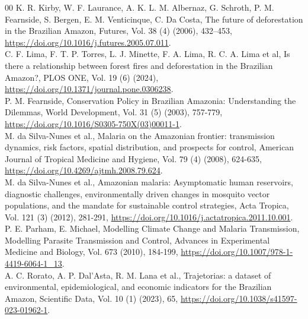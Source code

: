 \documentclass[a4paper,fleqn]{cas-dc}
\begin{document}
\begin{thebibliography}{00}
 K. R. Kirby, W. F. Laurance, A. K. L. M. Albernaz, G. Schroth, P. M. Fearnside, S. Bergen, E. M. Venticinque, C. Da Costa, The future of deforestation in the Brazilian Amazon, Futures, Vol. 38 (4) (2006), 432–453, \href{https://doi.org/10.1016/j.futures.2005.07.011}{https://doi.org/10.1016/j.futures.2005.07.011}.
\\
 C. F. Lima, F. T. P. Torres, L. J. Minette, F. A. Lima, R. C. A. Lima et al, Is there a relationship between forest fires and deforestation in the Brazilian Amazon?, PLOS ONE, Vol. 19 (6) (2024), \href{https://doi.org/10.1371/journal.pone.0306238}{https://doi.org/10.1371/journal.pone.0306238}.
\\
 P. M. Fearnside, Conservation Policy in Brazilian Amazonia: Understanding the Dilemmas, World Development, Vol. 31 (5) (2003), 757-779, \href{https://doi.org/10.1016/S0305-750X(03)00011-1}{https://doi.org/10.1016/S0305-750X(03)00011-1}.
\\
 M. da Silva-Nunes et al., Malaria on the Amazonian frontier: transmission dynamics, risk factors, spatial distribution, and prospects for control, American Journal of Tropical Medicine and Hygiene, Vol. 79 (4) (2008), 624-635, \href{https://doi.org/10.4269/ajtmh.2008.79.624}{https://doi.org/10.4269/ajtmh.2008.79.624}. 
\\
 M. da Silva-Nunes et al., Amazonian malaria: Asymptomatic human reservoirs, diagnostic challenges, environmentally driven changes in mosquito vector populations, and the mandate for sustainable control strategies, Acta Tropica, Vol. 121 (3) (2012), 281-291, \href{https://doi.org/10.1016/j.actatropica.2011.10.001}{https://doi.org/10.1016/j.actatropica.2011.10.001}.
\\
 P. E. Parham, E. Michael, Modelling Climate Change and Malaria Transmission, Modelling Parasite Transmission and Control, Advances in Experimental Medicine and Biology, Vol. 673 (2010), 184-199, \href{https://doi.org/10.1007/978-1-4419-6064-1_13}{https://doi.org/10.1007/978-1-4419-6064-1\_13}.
\\
 A. C. Rorato, A. P. Dal’Asta, R. M. Lana et al., Trajetorias: a dataset of environmental, epidemiological, and economic indicators for the Brazilian Amazon, Scientific Data, Vol. 10 (1) (2023), 65, \href{https://doi.org/10.1038/s41597-023-01962-1}{https://doi.org/10.1038/s41597-023-01962-1}.

\end{thebibliography}
\end{document}
